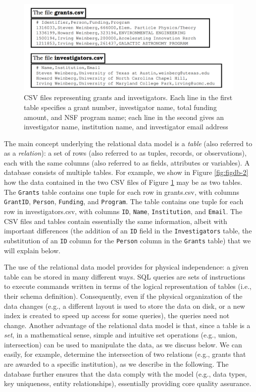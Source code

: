 \documentclass[]{krantz}
\begin{document}
\begin{figure}

{\centering \includegraphics[width=0.7\linewidth]{ChapterDB/figures/figdb-1} 

}

\caption{CSV files representing grants and investigators. Each line in the first table specifies a grant number, investigator name, total funding amount, and NSF program name; each line in the second gives an investigator name, institution name, and investigator email address}\label{fig:figdb-1}
\end{figure}

The main concept underlying the relational data model is a \emph{table}
(also referred to as a \emph{relation}): a set of rows (also referred to
as tuples, records, or observations), each with the same columns (also
referred to as fields, attributes or variables). A database consists of
multiple tables. For example, we show in Figure \ref{fig:figdb-2} how
the data contained in the two CSV files of Figure \ref{fig:figdb-1} may
be as two tables. The \texttt{Grants} table contains one tuple for each
row in grants.csv, with columns \texttt{GrantID}, \texttt{Person},
\texttt{Funding}, and \texttt{Program}. The table contains one tuple for
each row in investigators.csv, with columns \texttt{ID}, \texttt{Name},
\texttt{Institution}, and \texttt{Email}. The CSV files and tables
contain essentially the same information, albeit with important
differences (the addition of an \texttt{ID} field in the
\texttt{Investigators} table, the substitution of an \texttt{ID} column
for the \texttt{Person} column in the \texttt{Grants} table) that we
will explain below.

The use of the relational data model provides for physical independence:
a given table can be stored in many different ways. SQL queries are sets
of instructions to execute commands written in terms of the logical
representation of tables (i.e., their schema definition). Consequently,
even if the physical organization of the data changes (e.g., a different
layout is used to store the data on disk, or a new index is created to
speed up access for some queries), the queries need not change. Another
advantage of the relational data model is that, since a table is a
\emph{set}, in a mathematical sense, simple and intuitive set operations
(e.g., union, intersection) can be used to manipulate the data, as we
discuss below. We can easily, for example, determine the intersection of
two relations (e.g., grants that are awarded to a specific institution),
as we describe in the following. The database further ensures that the
data comply with the model (e.g., data types, key uniqueness, entity
relationships), essentially providing core quality assurance.
\end{document}
